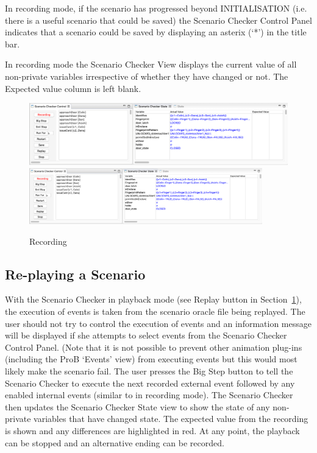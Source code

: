 In recording mode, if the scenario has progressed beyond INITIALISATION (i.e. there is a useful scenario that could be saved) the Scenario Checker Control Panel indicates that a scenario could be saved by displaying an asterix (`*') in the title bar.

In recording mode the Scenario Checker View displays the current value of all non-private variables irrespective of whether they have changed or not.
The Expected value column is left blank.

\begin{figure}[!htbp]
	\centering
	\ifplastex
	\includegraphics[width=512]{figures/recording}
	\else
	\includegraphics[width=0.9\textwidth]{figures/recording}
	\fi
	\caption{Recording}
	\label{fig:recording}
\end{figure}

\subsection{Re-playing a Scenario}
\label{sec:playback}

With the Scenario Checker in playback mode (see Replay button in Section~\ref{fig:recording}), the execution of events is taken from the scenario oracle file being replayed.
The user should not try to control the execution of events and an information message will be displayed if she attempts to select events from the Scenario Checker Control Panel. 
(Note that it is not possible to prevent other animation plug-ins (including the ProB `Events' view) from executing events but this would most likely make the scenario fail. 
The user presses the Big Step button to tell the Scenario Checker to execute the next recorded external event followed by any enabled internal events (similar to in recording mode).
The Scenario Checker then updates the Scenario Checker State view to show the state of any non-private variables that have changed state.
The expected value from the recording is shown and any differences are highlighted in red.
At any point, the playback can be stopped and an alternative ending can be recorded.

